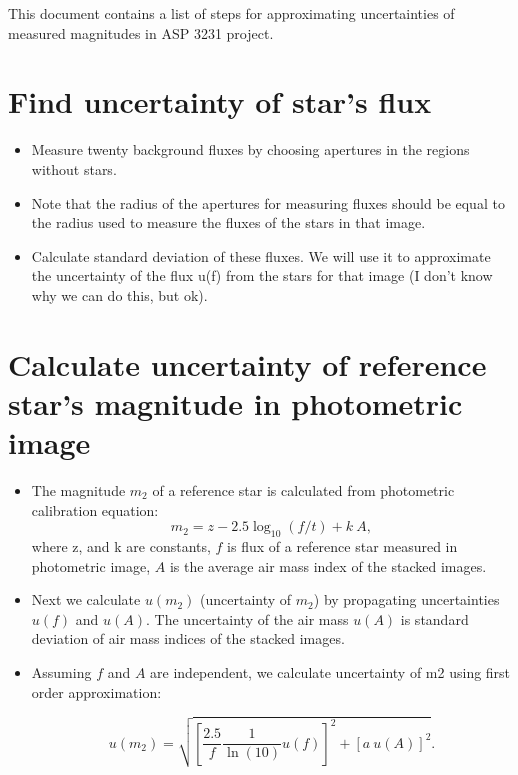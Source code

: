 This document contains a list of steps for approximating uncertainties of measured magnitudes in ASP 3231 project.

\section{Find uncertainty of star's flux}

\begin{itemize}
  \item Measure twenty background fluxes by choosing apertures in the regions without stars.
  \item Note that the radius of the apertures for measuring fluxes should be equal to the radius used to measure the fluxes of the stars in that image.
  \item Calculate standard deviation of these fluxes. We will use it to approximate the uncertainty of the flux u(f) from the stars for that image (I don't know why we can do this, but ok).
\end{itemize}


\section{Calculate uncertainty of reference star’s magnitude in photometric image}

\begin{itemize}
  \item The magnitude $m_2$ of a reference star is calculated from photometric calibration equation:
  \begin{equation}
  m_2 = z - 2.5 \log_{10}(f/t) + k \ A,
  \end{equation}
  where z, and k are constants, $f$ is flux of a reference star measured in photometric image, $A$ is the average air mass index of the stacked images.
  \item Next we calculate $u(m_2)$ (uncertainty of $m_2$) by propagating uncertainties  $u(f)$ and $u(A)$. The uncertainty of the air mass $u(A)$ is standard deviation of air mass indices of the stacked images.
  
  \item Assuming $f$ and $A$ are independent, we calculate uncertainty of m2 using first order approximation:
  
  \begin{equation}
    u(m_2) = \sqrt{ \left[ \frac{2.5}{f} \frac{1}{\ln(10)} u(f) \right]^2 + \left[ a \ u(A)\right]^2}.
  \end{equation}
\end{itemize}


